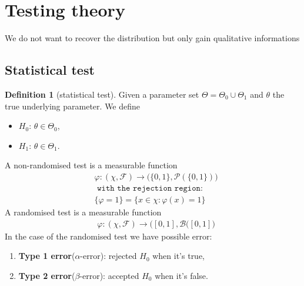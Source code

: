 \documentclass[a4paper,12pt, oneside, fleqn]{book}
\theoremstyle{definition}
\newtheorem{definition}{Definition}[section]
\theoremstyle{remark}
\begin{document}
\section{Testing theory}
We do not want to recover the distribution but only gain qualitative informations
\subsection{Statistical test}
\begin{definition}[statistical test]
Given a parameter set $\Theta = \Theta_0 \cup \Theta_1$ and $\theta$ the true underlying parameter. We define
\begin{itemize}
	\item $H_0$: $\theta \in \Theta_0$, 
	\item $H_1$: $\theta \in \Theta_1$.
\end{itemize} 
A non-randomised test is a measurable function
\begin{align*}
	&\varphi: (\chi, \mathcal{F}) \rightarrow \bigg(\{0, 1\}, \mathcal{P}(\{0, 1\}) \bigg)\\
	&\texttt{ with the rejection region:}\\
	&\{\varphi = 1\} = \{ x \in \chi: \varphi(x) = 1\}
\end{align*}
A randomised test is a measurable function
\begin{align*}
	&\varphi:(\chi, \mathcal{F}) \rightarrow \bigg([0, 1], \mathcal{B}([0, 1]\bigg)
\end{align*}
In the case of the randomised test we have possible error:
\begin{enumerate}
	\item \textbf{Type 1 error}($\alpha$-error): rejected $H_0$ when it's true,
	\item \textbf{Type 2 error}($\beta$-error): accepted $H_0$ when it's false. 
\end{enumerate}
\end{definition}
\end{document}
